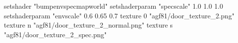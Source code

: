 setshader "bumpenvspecmapworld"
setshaderparam "specscale" 1.0 1.0 1.0
setshaderparam "envscale"  0.6 0.65 0.7
   texture 0 "agf81/door_texture_2.png"
   texture n "agf81/door_texture_2_normal.png"
   texture s "agf81/door_texture_2_spec.png"